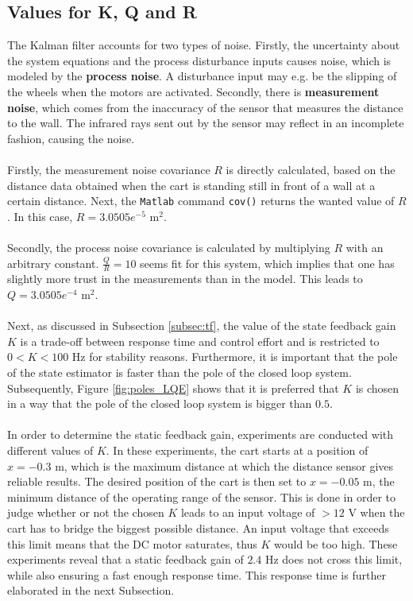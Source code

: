 \documentclass[a4paper,kul]{kulakarticle} %
\begin{document}
\subsection{Values for K, Q and R}
The Kalman filter accounts for two types of noise. Firstly, the uncertainty about the system equations and the process disturbance inputs causes noise, which is modeled by the \textbf{process noise}. A disturbance input may e.g. be the slipping of the wheels when the motors are activated. Secondly, there is \textbf{measurement noise}, which comes from the inaccuracy of the sensor that measures the distance to the wall. The infrared rays sent out by the sensor may reflect in an incomplete fashion, causing the noise. 
\\\\
Firstly, the measurement noise covariance $R$ is directly calculated, based on the distance data obtained when the cart is standing still in front of a wall at a certain distance. Next, the \texttt{Matlab} command \texttt{cov()} returns the wanted value of $R$. In this case, $R = 3.0505 e^{-5}$ m$^2$.
\\\\
Secondly, the process noise covariance is calculated by multiplying $R$ with an arbitrary constant. $\frac{Q}{R} = 10$ seems fit for this system, which implies that one has slightly more trust in the measurements than in the model. This leads to $Q = 3.0505 e^{-4}$ m$^2$.
\\\\
Next, as discussed in Subsection \ref{subsec:tf}, the value of the state feedback gain $K$ is a trade-off between response time and control effort and is restricted to $0 < K < 100$ Hz for stability reasons. Furthermore, it is important that the pole of the state estimator is faster than the pole of the closed loop system. Subsequently, Figure \ref{fig:poles_LQE} shows that it is preferred that $K$ is chosen in a way that the pole of the closed loop system is bigger than $0.5$.
\\\\
In order to determine the static feedback gain, experiments are conducted with different values of $K$. In these experiments, the cart starts at a position of $x = -0.3$ m, which is the maximum distance at which the distance sensor gives reliable results. The desired position of the cart is then set to $x = -0.05$ m, the minimum distance of the operating range of the sensor. This is done in order to judge whether or not the chosen $K$ leads to an input voltage of $> 12$ V when the cart has to bridge the biggest possible distance. An input voltage that exceeds this limit means that the DC motor saturates, thus $K$ would be too high. These experiments reveal that a static feedback gain of $2.4$ Hz does not cross this limit, while also ensuring a fast enough response time. This response time is further elaborated in the next Subsection.
\end{document}
